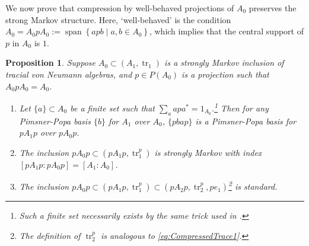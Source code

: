 \documentclass[11pt]{article}
\theoremstyle{plain}
\newtheorem{prop}[thm]{Proposition}
\theoremstyle{definition}
\DeclareMathOperator{\spann}{span}
\DeclareMathOperator{\tr}{tr}
\newcommand{\set}[2]{\left\{#1 \middle| #2\right\}}
\newcommand{\nn}[1]{\textcolor{red}{[[#1]]}}
\begin{document}
We now prove that compression by well-behaved projections of $A_0$ preserves the strong Markov structure.
Here, `well-behaved' is the condition 
$A_0 = A_0 p A_0 := \spann\set{apb}{a,b\in A_0}$,
which implies that the central support of $p$ in $A_0$ is $1$.

\begin{prop}
\label{prop:CompressingStronglyMarkovInclusion}
Suppose $A_0 \subset (A_1, \tr_1)$ is a strongly Markov inclusion of tracial von Neumann algebras, and $p\in P(A_0)$ is a projection such that $A_0pA_0 = A_0$.
\begin{enumerate}[label={\rm(\arabic*)}]
\item
Let $\{a\}\subset A_0$ be a finite set such that $\sum_{a} apa^* = 1_{A_0}$.\footnote{
Such a finite set necessarily exists by the same trick used in \cite[Prop.~3(b)]{MR561983}.
}
Then for any Pimsner-Popa basis $\{b\}$ for $A_1$ over $A_0$, $\{pbap\}$ is a Pimsner-Popa basis for $pA_1p$ over $pA_0p$.
\item
The inclusion $pA_0p \subset (pA_1p, \tr_1^p)$ is strongly Markov with index $[pA_1p:pA_0p] = [A_1:A_0]$.
\item
The inclusion $pA_0p \subset (pA_1p, \tr_1^p) \subset (pA_2p , \tr_2^p, pe_1)$\footnote{
The definition of $\tr^p_2$ is analogous to \eqref{eq:CompressedTrace1}.
} is standard.
\end{enumerate}
\end{prop}
\end{document}
